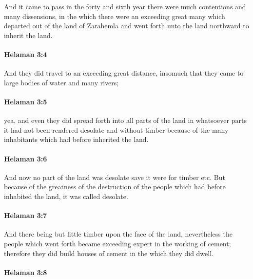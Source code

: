 			And it came to pass in the forty and sixth year
			there were much contentions and many dissensions,
			in the which there were an exceeding great many
			which departed out of the land of Zarahemla
			and went forth unto the land northward to inherit the land.

		\paragraph{Helaman 3:4} %
			\label{HELAMAN-3-4}

			And they did travel to an exceeding great distance,
			insomuch that they came to large bodies of water and many rivers;

		\paragraph{Helaman 3:5} %
			\label{HELAMAN-3-5}

			yea, and even they did spread forth into all parts of the land
			in whatsoever parts it had not been rendered desolate and without timber
			because of the many inhabitants which had before inherited the land.

		\paragraph{Helaman 3:6} %
			\label{HELAMAN-3-6}

			And now no part of the land was desolate save it were for timber etc.
			But because of the greatness of the destruction of the people
			which had before inhabited the land,
			it was called desolate.

		\paragraph{Helaman 3:7} %
			\label{HELAMAN-3-7}

			And there being but little timber upon the face of the land,
			nevertheless the people which went forth
			became exceeding expert in the working of cement;
			therefore they did build houses of cement in the which they did dwell.

		\paragraph{Helaman 3:8} %
			\label{HELAMAN-3-8}

